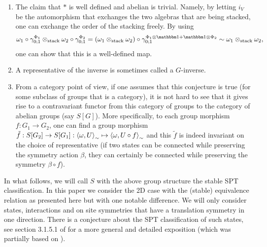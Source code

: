 \documentclass[12pt,a4paper,twoside]{article}
\numberwithin{equation}{section}
\begin{document}
\begin{enumerate}
	\item The claim that $*$ is well defined and abelian is trivial. Namely, by letting $i_V$ be the automorphism that exchanges the two algebras that are being stacked, one can exchange the order of the stacking freely. By using
	\begin{equation}
		\omega_1\circ\gamma^{\Phi_1}_{0;1}\otimes_\text{stack}\omega_2\circ\gamma^{\Phi_2}_{0;1}=(\omega_1\otimes_{\text{stack}}\omega_2)\circ\gamma^{\Phi_1\otimes\id+\id\otimes\Phi_2}_{0;1}\sim\omega_1\otimes_{\text{stack}}\omega_2,
	\end{equation}
	one can show that this is a well-defined map.
	\item A representative of the inverse is sometimes called a $G$-inverse.
	\item From a category point of view, if one assumes that this conjecture is true (for some subclass of groups that is a category), it is not hard to see that it gives rise to a contravariant functor from this category of groups to the category of abelian groups (say $S[G]$). More specifically, to each group morphism $f:G_1\rightarrow G_2$, one can find a group morphism $\tilde{f}:S[G_2]\rightarrow S[G_1]:\expval{\omega,U}_\sim\mapsto \expval{\omega,U\circ f}_\sim$ and this $\tilde{f}$ is indeed invariant on the choice of representative (if two states can be connected while preserving the symmetry action $\beta$, they can certainly be connected while preserving the symmetry $\beta\circ f$).
\end{enumerate}
In what follows, we will call $S$ with the above group structure the stable SPT classification. In this paper we consider the 2D case with the (stable) equivalence relation as presented here but with one notable difference. We will only consider states, interactions and on site symmetries that have a translation symmetry in one direction. There is a conjecture about the SPT classification of such states, see section 3.1.5.1 of \cite{xiong2019classification} for a more general and detailed exposition (which was partially based on \cite{Chen_2013}).
\end{document}
